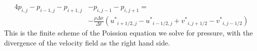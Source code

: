 \begin{equation}
\begin{split}
4p_{i,j} - p_{i-1,j} - p_{i+1,j} & - p_{i,j-1} - p_{i,j+1} = \\ &-\frac{\rho \Delta x}{\Delta t}({u^*}_{i+1/2,j} - {u^*}_{i-1/2,j} + {v^*}_{i,j+1/2} - {v^*}_{i,j-1/2})
\end{split}
\label{pressureeq}
\end{equation}
\noindent
This is the finite scheme of the Poission equation we solve for pressure, with the divergence of the velocity field as the right hand side.
